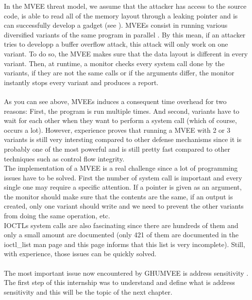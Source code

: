 \documentclass[english]{enstaPRE}
\begin{document}
In the MVEE threat model, we assume that the attacker has access to the source code, is able to read all of the memory layout through a leaking pointer and 
is can successfully develop a gadget (see ).
MVEEs consist in running various diversified variants of the same program in parallel \cite{DBLP:conf/eurosys/SalamatJGF09}. By this mean, if an attacker tries to developp
a buffer overflow attack, this attack will only work on one variant. To do so, the MVEE makes sure that the data layout is 
different in every variant. Then, at runtime, a monitor checks every system call done by the variants, if they are not the same
calls or if the arguments differ, the monitor instantly stops every variant and produces a report. \\
 \\
As you can see above, MVEEs induces a consequent time overhead for two reasons: First, the program is run multiple times. And second,
variants have to wait for each other when they want to perform a system call (which of course, occurs a lot).
However, experience proves that running a MVEE with 2 or 3 variants is still very intersting compared to other defense mechanisms 
since it is probably one of the most powerful and is still pretty fast compared to other techniques such as control flow integrity.
\\The implementation of a MVEE is a real challenge since a lot of programming issues have to be solved.
First the number of system call is important and every single one may require a specific attention. If a pointer is given as an argument,
the monitor should make sure that the contents are the same, if an output is created, only one variant should write and we need to 
prevent the other variants from doing the same operation, etc. \\ IOCTLs system calls are also fascinating since there are hundreds 
of them and only a small amount are documented (only 421 of them are documented in the ioctl\_list man page and this page informs 
that this list is very incomplete).  Still, with experience, those issues can be quickly solved.
\\ \\
The most important issue now encountered by GHUMVEE is address sensitivity \cite{volckaert2015cloning}. The first step of this internship was to understand and 
define what is address sensitivity and this will be the topic of the next chapter.
\end{document}
